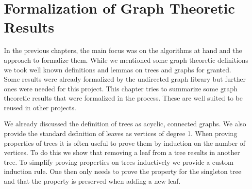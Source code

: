 \chapter{Formalization of Graph Theoretic Results}\label{chapter:isabelle_graphs}

In the previous chapters, the main focus was on the algorithms at hand and the approach to formalize them.
While we mentioned some graph theoretic definitions we took well known definitions and lemmas on trees and graphs for granted.
Some results were already formalized by the undirected graph library but further ones were needed for this project.
This chapter tries to summarize some graph theoretic results that were formalized in the process.
These are well suited to be reused in other projects.

We already discussed the definition of trees as acyclic, connected graphs.
We also provide the standard definition of leaves as vertices of degree 1.
When proving properties of trees it is often useful to prove them by induction on the number of vertices.
To do this we show that removing a leaf from a tree results in another tree.
To simplify proving properties on trees inductively we provide a custom induction rule.
One then only needs to prove the property for the singleton tree and that the property is preserved when adding a new leaf.

